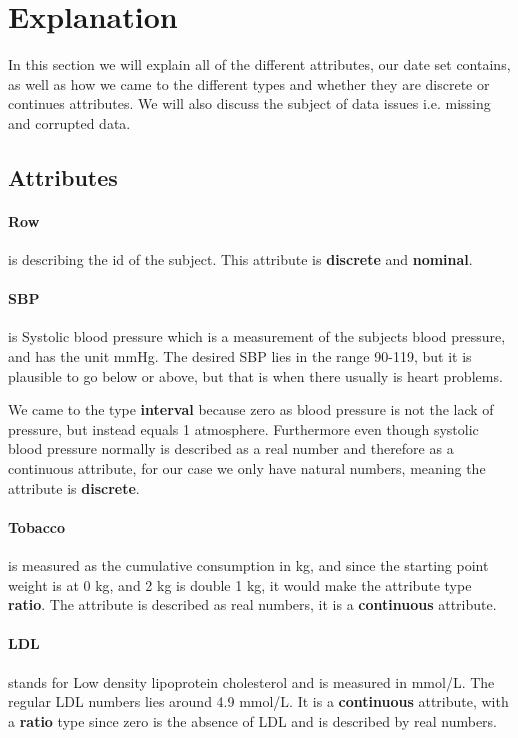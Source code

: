 \section{Explanation}
In this section we will explain all of the different attributes, our date set contains, as well as how we came to the different types and whether they are discrete or continues attributes. We will also discuss the subject of data issues i.e. missing and corrupted data.

\subsection{Attributes}

\paragraph{Row} is describing the id of the subject. This attribute is \textbf{discrete} and \textbf{nominal}.

\paragraph{SBP} is Systolic blood pressure which is a measurement of the subjects blood pressure, and has the unit mmHg. The desired SBP lies in the range 90-119, but it is plausible to go below or above, but that is when there usually is heart problems.

We came to the type \textbf{interval} because zero as blood pressure is not the lack of pressure, but instead equals 1 atmosphere. Furthermore even though systolic blood pressure normally is described as a real number and therefore as a continuous attribute, for our case we only have natural numbers, meaning the attribute is \textbf{discrete}.%

\paragraph{Tobacco} is measured as the cumulative consumption in kg, and since the starting point weight is at 0 kg, and 2 kg is double 1 kg, it would make the attribute type \textbf{ratio}.  The attribute is described as real numbers, it is a \textbf{continuous} attribute.

\paragraph{LDL} stands for Low density lipoprotein cholesterol and is measured in mmol/L. The regular LDL numbers lies around 4.9 mmol/L. It is a \textbf{continuous} attribute, with a \textbf{ratio} type since zero is the absence of LDL and is described by real numbers.

